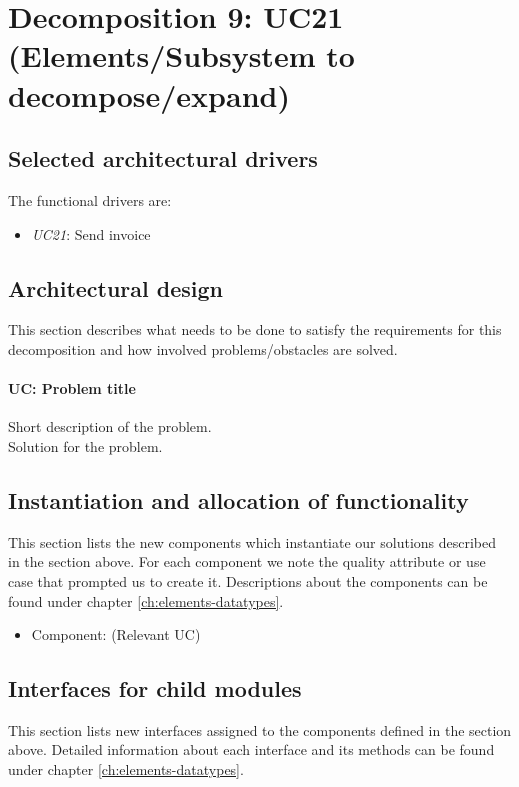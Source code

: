 \section{Decomposition 9: UC21 (Elements/Subsystem to decompose/expand)}


\subsection{Selected architectural drivers}
    The functional drivers are:
    \begin{itemize}
        \item \emph{UC21}: Send invoice \\
    \end{itemize}


\subsection{Architectural design}
    This section describes what needs to be done to satisfy the requirements for
    this decomposition and how involved problems/obstacles are solved.

    \paragraph{UC: Problem title}
        Short description of the problem.\\
        Solution for the problem.


\subsection{Instantiation and allocation of functionality}
    This section lists the new components which instantiate our solutions
    described in the section above. For each component we note the quality
    attribute or use case that prompted us to create it. Descriptions about
    the components can be found under chapter \ref{ch:elements-datatypes}. \\

    \begin{itemize}
        \item Component: (Relevant UC)
    \end{itemize}


\subsection{Interfaces for child modules}
    This section lists new interfaces assigned to the components defined
    in the section above. Detailed information about each interface and
    its methods can be found under chapter \ref{ch:elements-datatypes}. \\

